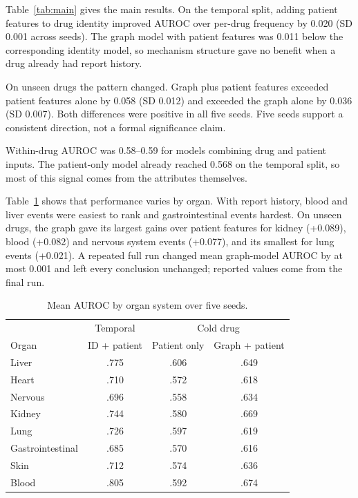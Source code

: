 \documentclass[conference,a4paper]{IEEEtran}
\begin{document}
Table~\ref{tab:main} gives the main results. On the temporal split, adding patient features to drug identity improved AUROC over per-drug frequency by 0.020 (SD 0.001 across seeds). The graph model with patient features was 0.011 below the corresponding identity model, so mechanism structure gave no benefit when a drug already had report history.

On unseen drugs the pattern changed. Graph plus patient features exceeded patient features alone by 0.058 (SD 0.012) and exceeded the graph alone by 0.036 (SD 0.007). Both differences were positive in all five seeds. Five seeds support a consistent direction, not a formal significance claim.

Within-drug AUROC was 0.58--0.59 for models combining drug and patient inputs. The patient-only model already reached 0.568 on the temporal split, so most of this signal comes from the attributes themselves.

Table~\ref{tab:organ} shows that performance varies by organ. With report history, blood and liver events were easiest to rank and gastrointestinal events hardest. On unseen drugs, the graph gave its largest gains over patient features for kidney (+0.089), blood (+0.082) and nervous system events (+0.077), and its smallest for lung events (+0.021). A repeated full run changed mean graph-model AUROC by at most 0.001 and left every conclusion unchanged; reported values come from the final run.

\begin{table}[t]
\centering
\caption{Mean AUROC by organ system over five seeds.}
\label{tab:organ}
\begin{tabular}{lccc}
\toprule
 & Temporal & \multicolumn{2}{c}{Cold drug} \\
Organ & ID + patient & Patient only & Graph + patient \\
\midrule
Liver & .775 & .606 & .649 \\
Heart & .710 & .572 & .618 \\
Nervous & .696 & .558 & .634 \\
Kidney & .744 & .580 & .669 \\
Lung & .726 & .597 & .619 \\
Gastrointestinal & .685 & .570 & .616 \\
Skin & .712 & .574 & .636 \\
Blood & .805 & .592 & .674 \\
\bottomrule
\end{tabular}
\end{table}
\end{document}
